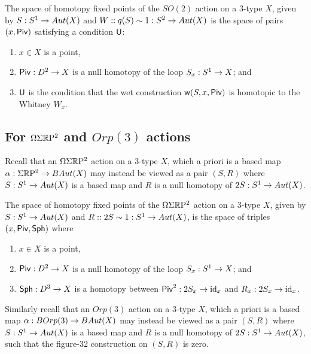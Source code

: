 \documentclass{amsart}
\begin{document}

\begin{proposition}
The space of homotopy fixed points of the $SO(2)$ action on a 3-type $X$, given by $S: S^1 \rightarrow Aut(X)$ and $W :: q(S) \sim 1 : S^2 \to Aut(X)$ is the space of pairs $(x,\mathsf{Piv})$ satisfying a condition $\mathsf{U}$:
\begin{enumerate}
\item $x \in X$ is a point,
\item $\mathsf{Piv}: D^2 \rightarrow X$ is a null homotopy of the loop $S_x: S^1 \rightarrow X$; and
\item $\mathsf{U}$ is the condition that the wet construction $\mathsf{w}(S,x,\mathsf{Piv})$ is homotopic to the Whitney $W_x$.
\end{enumerate}
\end{proposition}

\subsection{For $\Omega \Sigma \mathbb R \mathrm{P}^2$ and $Orp(3)$ actions}

Recall that an $\Omega \Sigma \mathbb R \mathrm{P}^2$ action on a 3-type $X$, which a priori is a based map $\alpha: \Sigma \mathbb R \mathrm{P}^2 \rightarrow BAut(X)$ may instead be viewed as a pair $(S,R)$ where $S : S^1 \rightarrow Aut(X)$ is a based map and $R$ is a null homotopy of $2S : S^1 \rightarrow Aut(X)$.

\begin{proposition}
The space of homotopy fixed points of the $\Omega \Sigma \mathbb R \mathrm{P}^2$ action on a 3-type $X$, given by $S: S^1 \rightarrow Aut(X)$ and $R:: 2S \sim 1 : S^1 \rightarrow Aut(X)$, is the space of triples $(x, \mathsf{Piv}, \mathsf{Sph})$ where
\begin{enumerate}
\item $x \in X$ is a point,
\item $\mathsf{Piv}: D^2 \rightarrow X$ is a null homotopy of the loop $S_x: S^1 \rightarrow X$; and
\item $\mathsf{Sph}: D^3 \rightarrow X$ is a homotopy between $\mathsf{Piv}^2 : 2 S_x \rightarrow \mathrm{id}_x$ and $R_x: 2 S_x \rightarrow \mathrm{id}_x$.
\end{enumerate}
\end{proposition}

Similarly recall that an $Orp(3)$ action on a 3-type $X$, which a priori is a based map $\alpha: BOrp(3) \rightarrow BAut(X)$ may instead be viewed as a pair $(S,R)$ where $S : S^1 \rightarrow Aut(X)$ is a based map and $R$ is a null homotopy of $2S : S^1 \rightarrow Aut(X)$, such that the figure-32 construction on $(S,R)$ is zero.
\end{document}
